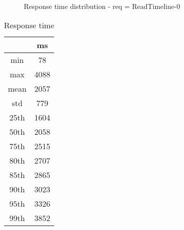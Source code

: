 \begin{minipage}{0.75\linewidth}
\begin{figure}[h]
\begin{adjustbox}{max width=1.0\linewidth, keepaspectratio}
  \end{adjustbox}
  \caption{Response time distribution - req = ReadTimeline-0}
\end{figure}
\end{minipage}\hfill\begin{minipage}{0.18\linewidth}
\begin{table}[h]
\begin{tabular}{|cc|}
\hline
\textbf{} & \textbf{ms}\\ \hline
 \Xhline{0.005\arrayrulewidth}
min & 78\\
 \Xhline{0.005\arrayrulewidth}
max & 4088\\
 \Xhline{0.005\arrayrulewidth}
mean & 2057\\
 \Xhline{0.005\arrayrulewidth}
std & 779\\
\hline
\hline
 \Xhline{0.005\arrayrulewidth}
25th & 1604\\
 \Xhline{0.005\arrayrulewidth}
50th & 2058\\
 \Xhline{0.005\arrayrulewidth}
75th & 2515\\
 \Xhline{0.005\arrayrulewidth}
80th & 2707\\
 \Xhline{0.005\arrayrulewidth}
85th & 2865\\
 \Xhline{0.005\arrayrulewidth}
90th & 3023\\
 \Xhline{0.005\arrayrulewidth}
95th & 3326\\
 \Xhline{0.005\arrayrulewidth}
99th & 3852\\
\hline
\end{tabular}
\caption{Response time}
\end{table}
\end{minipage}\hfill